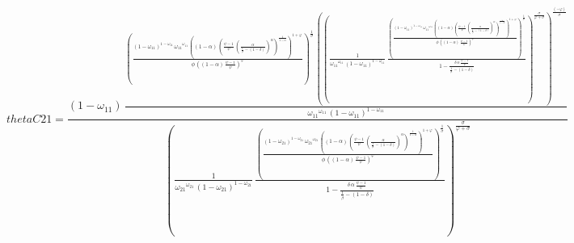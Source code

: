 \begin{dmath*}
thetaC21 = \frac{\left(1-{{\omega_{11}}}\right)\, \frac{\left(\frac{\left(1-{{\omega_{11}}}\right)^{1-{{\omega_{11}}}}\, {{\omega_{11}}}^{{{\omega_{11}}}}\, \left(\left(1-{{\alpha}}\right)\, \left(\frac{{{\psi}}-1}{{{\psi}}}\, \left(\frac{{{\alpha}}}{\frac{1}{{{\beta}}}-\left(1-{{\delta}}\right)}\right)^{{{\alpha}}}\right)^{\frac{1}{1-{{\alpha}}}}\right)^{1+{{\varphi}}}}{{{\phi}}\, \left(\left(1-{{\alpha}}\right)\, \frac{{{\psi}}-1}{{{\psi}}}\right)^{{{\varphi}}}}\right)^{\frac{1}{{{\sigma}}}}\, \left(\left(\frac{1}{{{\omega_{11}}}^{{{\omega_{11}}}}\, \left(1-{{\omega_{11}}}\right)^{1-{{\omega_{11}}}}}\, \frac{\left(\frac{\left(1-{{\omega_{11}}}\right)^{1-{{\omega_{11}}}}\, {{\omega_{11}}}^{{{\omega_{11}}}}\, \left(\left(1-{{\alpha}}\right)\, \left(\frac{{{\psi}}-1}{{{\psi}}}\, \left(\frac{{{\alpha}}}{\frac{1}{{{\beta}}}-\left(1-{{\delta}}\right)}\right)^{{{\alpha}}}\right)^{\frac{1}{1-{{\alpha}}}}\right)^{1+{{\varphi}}}}{{{\phi}}\, \left(\left(1-{{\alpha}}\right)\, \frac{{{\psi}}-1}{{{\psi}}}\right)^{{{\varphi}}}}\right)^{\frac{1}{{{\sigma}}}}}{1-\frac{{{\delta}}\, {{\alpha}}\, \frac{{{\psi}}-1}{{{\psi}}}}{\frac{1}{{{\beta}}}-\left(1-{{\delta}}\right)}}\right)^{\frac{{{\sigma}}}{{{\varphi}}+{{\sigma}}}}\right)^{\frac{\left(-{{\varphi}}\right)}{{{\sigma}}}}}{{{\omega_{11}}}^{{{\omega_{11}}}}\, \left(1-{{\omega_{11}}}\right)^{1-{{\omega_{11}}}}}}{\left(\frac{1}{{{\omega_{21}}}^{{{\omega_{21}}}}\, \left(1-{{\omega_{21}}}\right)^{1-{{\omega_{21}}}}}\, \frac{\left(\frac{\left(1-{{\omega_{21}}}\right)^{1-{{\omega_{21}}}}\, {{\omega_{21}}}^{{{\omega_{21}}}}\, \left(\left(1-{{\alpha}}\right)\, \left(\frac{{{\psi}}-1}{{{\psi}}}\, \left(\frac{{{\alpha}}}{\frac{1}{{{\beta}}}-\left(1-{{\delta}}\right)}\right)^{{{\alpha}}}\right)^{\frac{1}{1-{{\alpha}}}}\right)^{1+{{\varphi}}}}{{{\phi}}\, \left(\left(1-{{\alpha}}\right)\, \frac{{{\psi}}-1}{{{\psi}}}\right)^{{{\varphi}}}}\right)^{\frac{1}{{{\sigma}}}}}{1-\frac{{{\delta}}\, {{\alpha}}\, \frac{{{\psi}}-1}{{{\psi}}}}{\frac{1}{{{\beta}}}-\left(1-{{\delta}}\right)}}\right)^{\frac{{{\sigma}}}{{{\varphi}}+{{\sigma}}}}}
\end{dmath*}
